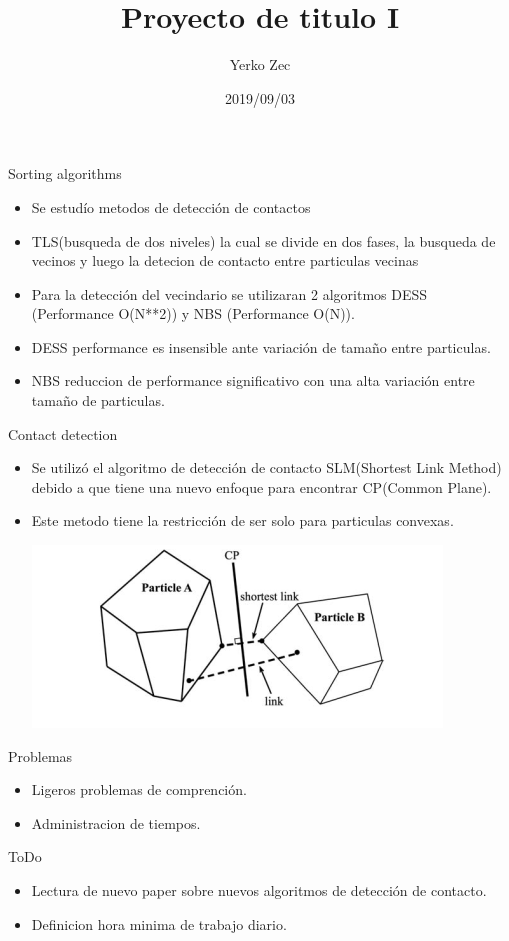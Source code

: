 \documentclass{beamer}
\title{Proyecto de titulo I}
\author{Yerko Zec}
\institute[]{FI - UNAB}
\date{2019/09/03}
\begin{document}
\begin{frame}[plain]
  \titlepage
\end{frame}

\addtocounter{framenumber}{-1}

\begin{frame}{Sorting algorithms}
\begin{itemize}
 \item Se estudío metodos de detección de contactos
 \item TLS(busqueda de dos niveles) la cual se divide en dos fases, la busqueda de vecinos y luego la detecion de contacto entre particulas vecinas
 \item Para la detección del vecindario se utilizaran 2 algoritmos DESS (Performance O(N**{2})) y  NBS (Performance O(N)).
 \item DESS performance es insensible ante variación de tamaño entre particulas.
 \item NBS reduccion de performance significativo con una alta variación entre tamaño de particulas.
\end{itemize}
\end{frame}

\begin{frame}{Contact detection}
\begin{itemize}
 \item Se utilizó el algoritmo de detección de contacto SLM(Shortest Link Method) debido a que tiene una nuevo enfoque para encontrar CP(Common Plane).
 \item Este metodo tiene la restricción de ser solo para particulas convexas.

 \includegraphics[width=0.5\linewidth]{CP}
\end{itemize}
\end{frame}

\begin{frame}{Problemas}
 \begin{itemize}
  \item Ligeros problemas de comprención.
  \item Administracion de tiempos.
 \end{itemize}
\end{frame}


\begin{frame}{ToDo}
\begin{itemize}
 \item Lectura de nuevo paper sobre nuevos algoritmos de detección de contacto.
 \item Definicion hora minima de trabajo diario. 
\end{itemize}
\end{frame}

\medskip


\end{document}
